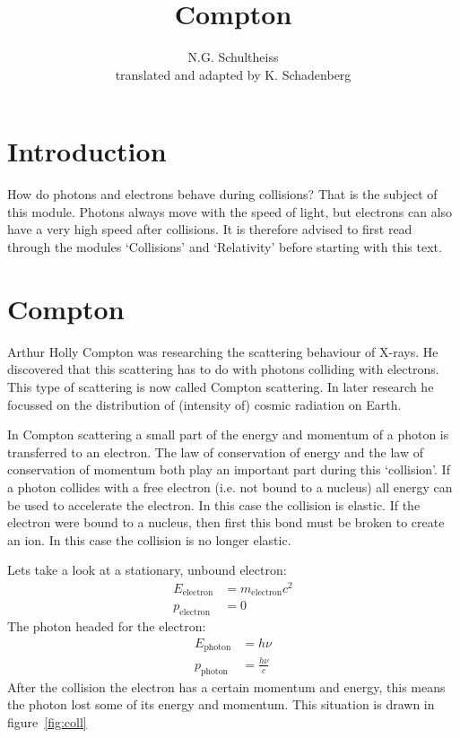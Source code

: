 \documentclass[12pt,a4paper]{article}
\author{N.G. Schultheiss \\ translated and adapted by K. Schadenberg}
\date{}
\title{Compton}
\numberwithin{equation}{section}
\numberwithin{figure}{section}
\numberwithin{table}{section}
\begin{document}
\maketitle

\section{Introduction}
How do photons and electrons behave during collisions? That is the subject of this module. Photons always move with the speed of light, but electrons can also have a very high speed after collisions. It is therefore advised to first read through the modules `Collisions' and `Relativity' before starting with this text.

\section{Compton}
Arthur Holly Compton was researching the scattering behaviour of X-rays. He discovered that this scattering has to do with photons colliding with electrons. This type of scattering is now called Compton scattering. In later research he focussed on the distribution of (intensity of) cosmic radiation on Earth.

In Compton scattering a small part of the energy and momentum of a photon is transferred to an electron. The law of conservation of energy and the law of conservation of momentum both play an important part during this `collision'. If a photon collides with a free electron (i.e. not bound to a nucleus) all energy can be used to accelerate the electron. In this case the collision is elastic. If the electron were bound to a nucleus, then first this bond must be broken to create an ion. In this case the collision is no longer elastic.

Lets take a look at a stationary, unbound electron:
\begin{align}
E_{\mbox{electron}} &= m_{\mbox{electron}}c^2 \\
p_{\mbox{electron}} &= 0 \label{eq:E_e}
\end{align}
The photon headed for the electron:
\begin{align}
E_{\mbox{photon}} &= h \nu\\
p_{\mbox{photon}} &= \frac{h \nu}{c} \label{eq:E_ph}
\end{align}
After the collision the electron has a certain momentum and energy, this means the photon lost some of its energy and momentum. This situation is drawn in figure~\ref{fig:coll}
\end{document}
